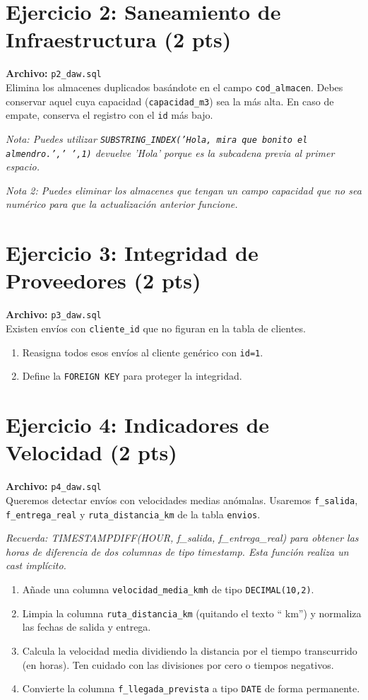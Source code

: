 \documentclass[12pt,a4paper]{article}
\begin{document}
\section{Ejercicio 2: Saneamiento de Infraestructura (2 pts)}
\textbf{Archivo:} \texttt{p2\_daw.sql} \\
Elimina los almacenes duplicados basándote en el campo \texttt{cod\_almacen}. Debes conservar aquel cuya capacidad (\texttt{capacidad\_m3}) sea la más alta. En caso de empate, conserva el registro con el \texttt{id} más bajo.

\textit{Nota: Puedes utilizar \texttt{SUBSTRING\_INDEX('Hola, mira que bonito el almendro.',' ',1)} devuelve 'Hola' porque es la subcadena previa al primer espacio.}

\textit{Nota 2: Puedes eliminar los almacenes que tengan un campo capacidad que no sea numérico para que la actualización anterior funcione.}

\section{Ejercicio 3: Integridad de Proveedores (2 pts)}
\textbf{Archivo:} \texttt{p3\_daw.sql} \\
Existen envíos con \texttt{cliente\_id} que no figuran en la tabla de clientes.
\begin{enumerate}
    \item Reasigna todos esos envíos al cliente genérico con \texttt{id=1}.
    \item Define la \texttt{FOREIGN KEY} para proteger la integridad.
\end{enumerate}

\section{Ejercicio 4: Indicadores de Velocidad (2 pts)}
\textbf{Archivo:} \texttt{p4\_daw.sql} \\
Queremos detectar envíos con velocidades medias anómalas. Usaremos \texttt{f\_salida}, \texttt{f\_entrega\_real} y \texttt{ruta\_distancia\_km} de la tabla \texttt{envios}.

\textit{Recuerda: TIMESTAMPDIFF(HOUR, f\_salida, f\_entrega\_real) para obtener las horas de diferencia de dos columnas de tipo timestamp. Esta función realiza un cast implícito.}

\begin{enumerate}
    \item Añade una columna \texttt{velocidad\_media\_kmh} de tipo \texttt{DECIMAL(10,2)}.
    \item Limpia la columna \texttt{ruta\_distancia\_km} (quitando el texto \enquote{ km}) y normaliza las fechas de salida y entrega.
    \item Calcula la velocidad media dividiendo la distancia por el tiempo transcurrido (en horas). Ten cuidado con las divisiones por cero o tiempos negativos.
    \item Convierte la columna \texttt{f\_llegada\_prevista} a tipo \texttt{DATE} de forma permanente.
\end{enumerate}
\end{document}
